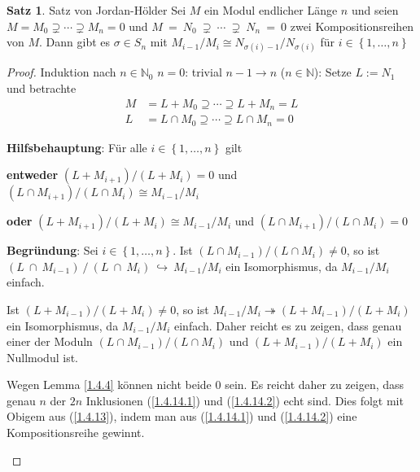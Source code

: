 \documentclass[
twoside=semi,
fontsize=12,
DIV=12, 
cleardoublepage=current,
leqno,
headings=optiontoheadandtoc, 
toc=idx
]{scrbook}
\newcommand{\N}{\mathbb{N}}
\newcommand{\set}[1]{\left\{ #1 \right\}}
\theoremstyle{definition}
\newtheorem{satz}[definition]{Satz}
\begin{document}
	\begin{satz}\label{1.4.14} Satz von Jordan-H\"older\newline
		Sei $M$ ein Modul endlicher L\"ange $n$ und seien $M = M_0 \supsetneq \cdots \supsetneq M_n = 0$ und $M~=~N_0~\supsetneq~\cdots~\supsetneq~N_n~=~0$ zwei Kompositionsreihen von $M$. Dann gibt es 
		$\sigma \in S_n$ mit $M_{i-1}/M_i \cong N_{\sigma(i)-1}/N_{\sigma(i)}$ f\"ur $i \in \set{1, \dots, n}$
		
		\begin{proof}
			Induktion nach $n \in \N_0$\newline
			$n = 0$: trivial\newline
			$n-1 \rightarrow n$ ($n \in \N$): Setze $L:=N_1$ und betrachte 
				\begin{align}
					M &= L + M_0 \supseteq \cdots \supseteq L + M_n = L \label{1.4.14.1}\tag{$*$}\\
					L &= L \cap M_0 \supseteq \cdots \supseteq L \cap M_n = 0 \label{1.4.14.2}\tag{$**$}
				\end{align}
			\begin{tcolorbox}[colback=white,colframe=blue,arc=0cm]
				\textbf{Hilfsbehauptung}: F\"ur alle $i \in \set{1, \dots, n}$ gilt 
				
				\textbf{entweder} $(L+M_{i+1})/(L+M_i) = 0$ und $(L\cap M_{i+1})/(L\cap M_i) \cong M_{i-1}/M_i$
				
				\textbf{oder} $(L+M_{i+1})/(L+M_i) \cong M_{i-1}/M_i$ und $(L\cap M_{i+1})/(L\cap M_i) = 0$
				
				\tcblower
				\textbf{Begr\"undung}: Sei $i \in \set{1, \dots, n}$. Ist $(L\cap M_{i-1})/(L\cap M_i) \neq 0$, so ist \linebreak $(L~\cap~M_{i-1})~/~(L~\cap~M_i)~\hookrightarrow~ M_{i-1}/M_i$
				ein Isomorphismus, da $M_{i-1}/M_i$ einfach.
				
				\noindent Ist $(L+M_{i-1})/(L+M_i) \neq 0$, so ist $M_{i-1}/M_i \twoheadrightarrow (L+M_{i-1})/(L+M_i)$ ein Isomorphismus, da $M_{i-1}/M_i$ einfach. Daher reicht es zu zeigen, dass genau einer der Moduln $(L\cap M_{i-1})/(L\cap M_i)$ und $(L+M_{i-1})/(L+M_i)$ ein Nullmodul ist.
				
				\noindent Wegen Lemma \ref{1.4.4} k\"onnen nicht beide $0$ sein. Es reicht daher zu zeigen, dass genau $n$ der $2n$ Inklusionen (\ref{1.4.14.1}) und (\ref{1.4.14.2}) echt sind. Dies folgt mit Obigem aus (\ref{1.4.13}), indem man aus (\ref{1.4.14.1}) und (\ref{1.4.14.2}) eine Kompositionsreihe gewinnt. 
			\end{tcolorbox}
			

\end{proof}
\end{satz}
\end{document}
